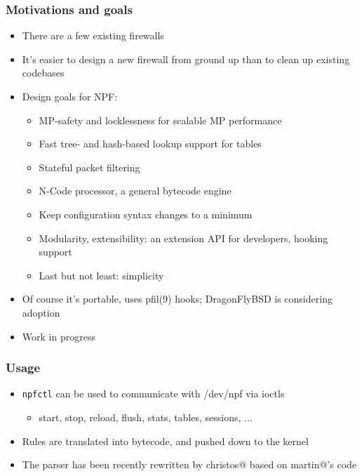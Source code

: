\documentclass[magyar]{beamer}
\begin{document}
\begin{frame}
\frametitle{Motivations and goals}
\begin{itemize}
	\item There are a few existing firewalls
	\item It's easier to design a new firewall from ground up than to clean up existing codebases
	\item Design goals for NPF:
	\begin{itemize}
		\item MP-safety and locklessness for scalable MP performance
		\item Fast tree- and hash-based lookup support for tables
		\item Stateful packet filtering
		\item N-Code processor, a general bytecode engine
		\item Keep configuration syntax changes to a minimum
		\item Modularity, extensibility: an extension API for developers, hooking support
		\item Last but not least: simplicity
	\end{itemize}
	\item Of course it's portable, uses pfil(9) hooks; DragonFlyBSD is considering adoption 
	\item Work in progress
\end{itemize}
\end{frame}

\begin{frame}
\frametitle{Usage}
\begin{itemize}
	\item \texttt{npfctl} can be used to communicate with /dev/npf via ioctls
		\begin{itemize}
			\item start, stop, reload, flush, stats, tables, sessions, ...
		\end{itemize}
	\item Rules are translated into bytecode, and pushed down to the kernel
	\item The parser has been recently rewritten by christos@ based on martin@'s code
\end{itemize}
\end{frame}
\end{document}
